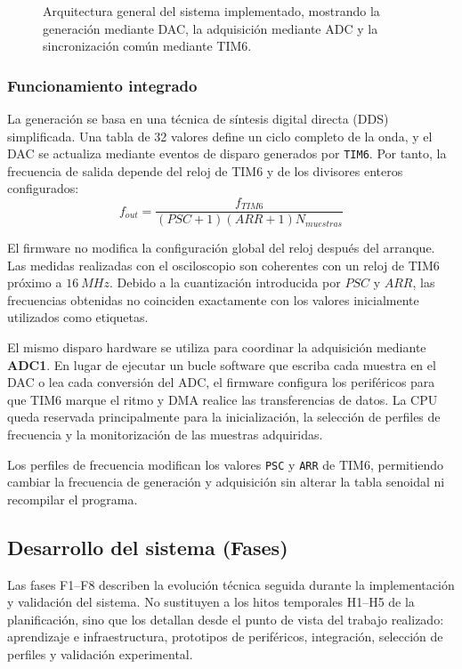 \documentclass[11pt,a4paper]{article}
\begin{document}
\begin{figure}[H]
{%
}
\caption{Arquitectura general del sistema implementado, mostrando la generación mediante DAC, la adquisición mediante ADC y la sincronización común mediante TIM6.}
\label{fig:arquitectura-general}
\end{figure}


\subsubsection{Funcionamiento integrado}
La generación se basa en una técnica de síntesis digital directa (DDS) simplificada. Una tabla de 32 valores define un ciclo completo de la onda, y el DAC se actualiza mediante eventos de disparo generados por \texttt{TIM6}. Por tanto, la frecuencia de salida depende del reloj de TIM6 y de los divisores enteros configurados:
\[
f_{out} =
\frac{f_{TIM6}}
{(PSC+1)(ARR+1)N_{muestras}}
\]

El firmware no modifica la configuración global del reloj después del arranque. Las medidas realizadas con el osciloscopio son coherentes con un reloj de TIM6 próximo a \(16~MHz\). Debido a la cuantización introducida por \(PSC\) y \(ARR\), las frecuencias obtenidas no coinciden exactamente con los valores inicialmente utilizados como etiquetas.

El mismo disparo hardware se utiliza para coordinar la adquisición mediante \textbf{ADC1}. En lugar de ejecutar un bucle software que escriba cada muestra en el DAC o lea cada conversión del ADC, el firmware configura los periféricos para que TIM6 marque el ritmo y DMA realice las transferencias de datos. La CPU queda reservada principalmente para la inicialización, la selección de perfiles de frecuencia y la monitorización de las muestras adquiridas.

Los perfiles de frecuencia modifican los valores \texttt{PSC} y \texttt{ARR} de TIM6, permitiendo cambiar la frecuencia de generación y adquisición sin alterar la tabla senoidal ni recompilar el programa.


\subsection{Desarrollo del sistema (Fases)}

Las fases F1--F8 describen la evolución técnica seguida durante la implementación y validación del sistema. No sustituyen a los hitos temporales H1--H5 de la planificación, sino que los detallan desde el punto de vista del trabajo realizado: aprendizaje e infraestructura, prototipos de periféricos, integración, selección de perfiles y validación experimental.
\end{document}
